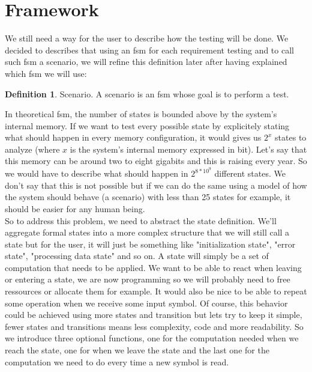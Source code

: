 \documentclass[12pt]{article}
\theoremstyle{definition}
\newtheorem{definition}{Definition}[section]
\theoremstyle{definition}
\theoremstyle{remark}
\begin{document}



\section{Framework}


We still need a way for the user to describe how the testing will be done. We decided to describes that using an \gls{fsm} for each requirement testing and to call such \gls{fsm} a scenario, we will refine this definition later after having explained which \gls{fsm} we will use:

\theoremstyle{definition}
\begin{definition}{Scenario.} A scenario is an \gls{fsm} whose goal is to perform a test.
\end{definition}

In theoretical \gls{fsm}, the number of states is bounded above by the system's internal memory. If we want to test every possible state by explicitely stating what should happen in every memory configuration, it would gives us $2^x$ states to analyze (where $x$ is the system's internal memory expressed in bit). Let's say that this memory can be around two to eight gigabits and this is raising every year. So we would have to describe what should happen in $2^{8*10^9}$ different states. We don't say that this is not possible but if we can do the same using a model of how the system should behave (a scenario) with less than 25 states for example, it should be easier for any human being.\\

So to address this problem, we need to abstract the state definition. We'll aggregate formal states into a more complex structure that we will still call a state but for the user, it will just be something like "initialization state", "error state", "processing data state" and so on. A state will simply be a set of computation that needs to be applied.
We want to be able to react when leaving or entering a state, we are now programming so we will probably need to free ressources or allocate them for example. It would also be nice to be able to repeat some operation when we receive some input symbol. Of course, this behavior could be achieved using more states and transition but lets try to keep it simple, fewer states and transitions means less complexity, code and more readability. So we introduce three optional functions, one for the computation needed when we reach the state, one for when we leave the state and the last one for the computation we need to do every time a new symbol is read.\\
\end{document}
